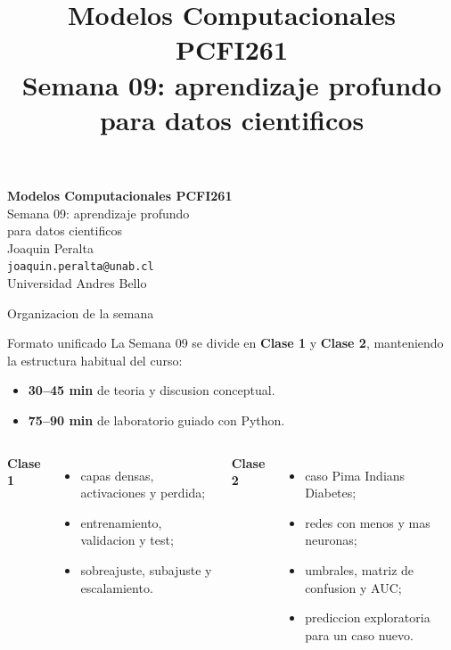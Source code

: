 

\titlegraphic{}
\title[PCFI261 -- Semana 09]{\Large Modelos Computacionales PCFI261\\Semana 09: aprendizaje profundo\\para datos cientificos}
\newcommand{\compactcode}{\fontsize{5}{4.7}\selectfont}



\begin{frame}[plain]
\centering
\vfill
{\Large\bfseries Modelos Computacionales PCFI261}\\[0.25cm]
{\large Semana 09: aprendizaje profundo\\para datos cientificos}\\[0.7cm]
{\large Joaquin Peralta}\\[0.15cm]
{\small \texttt{joaquin.peralta@unab.cl}}\\[0.35cm]
{\small Universidad Andres Bello}
\vfill
\end{frame}

\begin{frame}{Organizacion de la semana}
\begin{block}{Formato unificado}
La Semana 09 se divide en \textbf{Clase 1} y \textbf{Clase 2}, manteniendo la estructura habitual del curso:
\begin{itemize}
    \item \textbf{30--45 min} de teoria y discusion conceptual.
    \item \textbf{75--90 min} de laboratorio guiado con Python.
\end{itemize}
\end{block}

\begin{columns}[T,onlytextwidth]
\textbf{Clase 1}
\begin{itemize}
    \item capas densas, activaciones y perdida;
    \item entrenamiento, validacion y test;
    \item sobreajuste, subajuste y escalamiento.
\end{itemize}

\textbf{Clase 2}
\begin{itemize}
    \item caso Pima Indians Diabetes;
    \item redes con menos y mas neuronas;
    \item umbrales, matriz de confusion y AUC;
    \item prediccion exploratoria para un caso nuevo.
\end{itemize}
\end{columns}
\end{frame}

